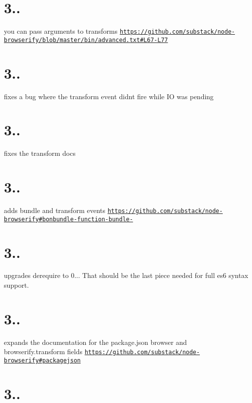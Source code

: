 \section*{3..}

you can pass arguments to transforms \href{https://github.com/substack/node-browserify/blob/master/bin/advanced.txt#L67-L77}{\tt https\+://github.\+com/substack/node-\/browserify/blob/master/bin/advanced.\+txt\#\+L67-\/\+L77}

\section*{3..}

fixes a bug where the transform event didn\textquotesingle{}t fire while IO was pending

\section*{3..}

fixes the transform docs

\section*{3..}

adds \textquotesingle{}bundle\textquotesingle{} and \textquotesingle{}transform\textquotesingle{} events \href{https://github.com/substack/node-browserify#bonbundle-function-bundle-}{\tt https\+://github.\+com/substack/node-\/browserify\#bonbundle-\/function-\/bundle-\/}

\section*{3..}

upgrades derequire to 0... That should be the last piece needed for full es6 syntax support.

\section*{3..}

expands the documentation for the package.\+json browser and browserify.\+transform fields \href{https://github.com/substack/node-browserify#packagejson}{\tt https\+://github.\+com/substack/node-\/browserify\#packagejson}

\section*{3..}

